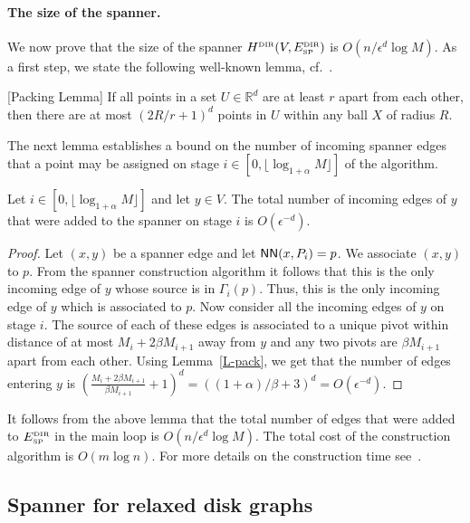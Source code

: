 \documentclass[proceedings]{stacs}
\theoremstyle{plain}\newtheorem{satz}[thm]{Satz}
\theoremstyle{definition}\newtheorem{crucial}[thm]{Crucial Definition}
\newcommand{\NN}{\mbox{\sf NN}}
\def\SP{\mbox{\tiny SP}}
\def\DIR{\mbox{\tiny DIR}}
\begin{document}
\paragraph{The size of the spanner.}
We now prove that the size of the spanner
$H^{\DIR}(V,E_{\SP}^{\DIR})$ is $O(n/\epsilon^d \log M)$. As a
first step, we state the following well-known lemma,
cf.~\cite{GaoGuiNgu04}.

\begin{lemma}\label{L-pack}[Packing Lemma]
If all points in a set $U \in \mathbb{R}^d$ are at least $r$ apart
from each other, then there are at most $(2R/r + 1)^d$ points in
$U$ within any ball $X$ of radius $R$.
\end{lemma}

The next lemma establishes a bound on the number of incoming
spanner edges that a point may be assigned on stage $i \in
[0,\lfloor\log_{1+\alpha}M\rfloor]$ of the algorithm.

\begin{lemma}\label{L-level-size}
Let $i \in [0,\lfloor\log_{1+\alpha}M\rfloor]$ and let $y\in V$.
The total number of incoming edges of $y$ that were added to the
spanner on stage $i$ is $O(\epsilon^{-d})$.
\end{lemma}
\begin{proof}
Let $(x,y)$ be a spanner edge and let $\NN(x,P_i) = p$. We
associate $(x,y)$ to $p$. From the spanner construction algorithm
it follows that this is the only incoming edge of $y$ whose source
is in $\Gamma_i(p)$. Thus, this is the only incoming edge of $y$
which is associated to $p$. Now consider all the incoming edges of
$y$ on stage $i$. The source of each of these edges is associated
to a unique pivot within distance of at most $M_i+2\beta M_{i+1}$
away from $y$ and any two pivots are $\beta M_{i+1}$ apart from
each other. Using Lemma~\ref{L-pack}, we get that the number of
edges entering $y$ is $(\frac{M_i+2\beta M_{i+1}}{\beta M_{i+1}} +
1)^d=((1+\alpha)/\beta+3)^d=O(\epsilon^{-d})$.
\end{proof}

It follows from the above lemma that the total number of edges
that were added to $E_{\SP}^{\DIR}$ in the main loop is
$O(n/\epsilon^d \log M)$. The total cost of the construction
algorithm is $O(m\log n)$. For more details on the construction
time see~\cite{PeRo08}.

\subsection{Spanner for relaxed disk graphs}
\end{document}
